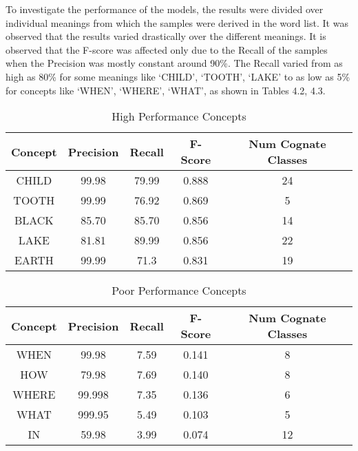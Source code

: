 To investigate the performance of the models, the results were divided over individual meanings from which the samples were derived in the word list. It was observed that the results varied drastically over the different meanings. It is observed that the F-score was affected only due to the Recall of the samples when the Precision was mostly constant around 90\%. The Recall varied from as high as 80\% for some meanings like `CHILD', `TOOTH', `LAKE' to as low as 5\% for concepts like `WHEN', `WHERE', `WHAT', as shown in Tables 4.2, 4.3.

\begin{table}[h!]
\centering
\begin{tabular}{|c|c|c|c|c|}
\hline
\textbf{Concept} & \textbf{Precision} & \textbf{Recall} & \textbf{F-Score} & \textbf{Num Cognate Classes} \\ \hline
CHILD            & 99.98              & 79.99           & 0.888            & 24                           \\ \hline
TOOTH            & 99.99              & 76.92           & 0.869            & 5                            \\ \hline
BLACK            & 85.70              & 85.70           & 0.856            & 14                           \\ \hline
LAKE             & 81.81              & 89.99           & 0.856            & 22                           \\ \hline
EARTH            & 99.99              & 71.3            & 0.831            & 19                           \\ \hline
\end{tabular}
\caption{High Performance Concepts}
\end{table}

\begin{table}[h!]
\centering
\label{my-label}
\begin{tabular}{|c|c|c|c|c|}
\hline
\textbf{Concept} & \textbf{Precision} & \textbf{Recall} & \textbf{F-Score} & \textbf{Num Cognate Classes} \\ \hline
WHEN             & 99.98              & 7.59            & 0.141            & 8                            \\ \hline
HOW              & 79.98              & 7.69            & 0.140            & 8                            \\ \hline
WHERE            & 99.998             & 7.35            & 0.136            & 6                            \\ \hline
WHAT             & 999.95             & 5.49            & 0.103            & 5                            \\ \hline
IN               & 59.98              & 3.99            & 0.074            & 12                           \\ \hline
\end{tabular}
\caption{Poor Performance Concepts}
\end{table}

